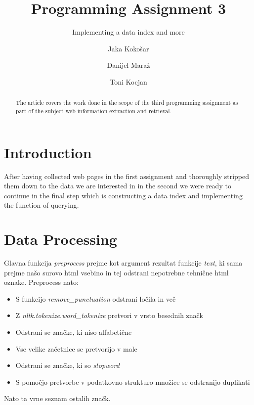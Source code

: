\documentclass[runningheads]{llncs}
\begin{document}
\title{Programming Assignment 3}
\subtitle{Implementing a data index and more}

\author{
  Jaka Kokošar
  \and
  Danijel Maraž
  \and
  Toni Kocjan
}


\maketitle             

\begin{abstract}
The article covers the work done in the scope of the third programming assignment as part of the subject web information extraction and retrieval. 

\end{abstract}

\section{Introduction}
After having collected web pages in the first assignment and thoroughly stripped them down to the data we are interested in in the second we were ready to continue in the final step which is constructing a data index and implementing the function of querying.

\section{Data Processing}
Glavna funkcija \textit{preprocess} prejme kot argument rezultat funkcije \textit{text}, ki sama prejme našo surovo html vsebino in tej odstrani nepotrebne tehnične html oznake. Preprocess nato:
\begin{itemize}
\item S funkcijo \textit{remove\_punctuation} odstrani ločila in več
\item Z \textit{nltk.tokenize.word\_tokenize} pretvori v vrsto besednih značk
\item Odstrani se značke, ki niso alfabetične
\item Vse velike začetnice se pretvorijo v male
\item Odstrani se značke, ki so \textit{stopword}
\item S pomočjo pretvorbe v podatkovno strukturo množice se odstranijo duplikati
\end{itemize} 
Nato ta vrne seznam ostalih značk.
\end{document}
